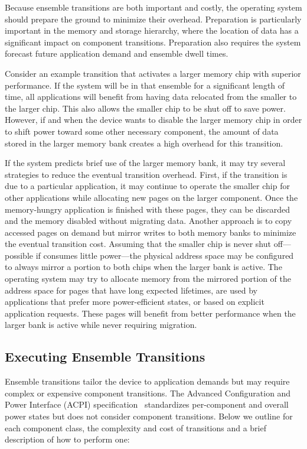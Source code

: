Because ensemble transitions are both important and costly, the operating
system should prepare the ground to minimize their overhead. Preparation is
particularly important in the memory and storage hierarchy, where the
location of data has a significant impact on component transitions.
Preparation also requires the system forecast future application demand and
ensemble dwell times.

Consider an example transition that activates a larger memory chip with
superior performance. If the system will be in that ensemble for a
significant length of time, all applications will benefit from having data
relocated from the smaller to the larger chip. This also allows the smaller
chip to be shut off to save power. However, if and when the device wants to
disable the larger memory chip in order to shift power toward some other
necessary component, the amount of data stored in the larger memory bank
creates a high overhead for this transition.

If the system predicts brief use of the larger memory bank, it may try
several strategies to reduce the eventual transition overhead. First, if the
transition is due to a particular application, it may continue to operate the
smaller chip for other applications while allocating new pages on the larger
component. Once the memory-hungry application is finished with these pages,
they can be discarded and the memory disabled without migrating data. Another
approach is to copy accessed pages on demand but mirror writes to both memory
banks to minimize the eventual transition cost. Assuming that the smaller
chip is never shut off---possible if consumes little power---the physical
address space may be configured to always mirror a portion to both chips when
the larger bank is active. The operating system may try to allocate memory
from the mirrored portion of the address space for pages that have long
expected lifetimes, are used by applications that prefer more power-efficient
states, or based on explicit application requests. These pages will benefit
from better performance when the larger bank is active while never requiring
migration.

\subsection{Executing Ensemble Transitions}
\label{subsec-execute}

Ensemble transitions tailor the device to application demands but may require
complex or expensive component transitions. The Advanced Configuration and
Power Interface (ACPI) specification~\cite{acpi-standard} standardizes
per-component and overall power states but does not consider component
transitions. Below we outline for each component class, the complexity and
cost of transitions and a brief description of how to perform one:

